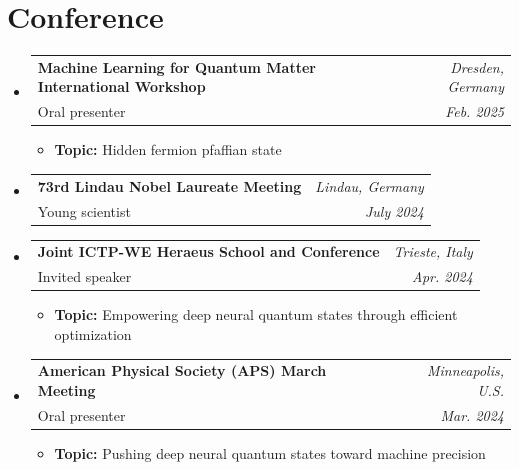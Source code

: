 \documentclass[a4paper,11pt]{article}
\makeatletter
\newcommand{\resumeItem}[1]{\item\small{#1 \vspace{-2pt}}}
\newcommand{\resumeSubheading}[4]{
  \vspace{-2pt}\item
    \begin{tabular*}{0.97\textwidth}[t]{l@{\extracolsep{\fill}}r}
      \textbf{#1} & \textit{\small #2} \\
      \small#3 & \textit{\small #4} \\
    \end{tabular*}\vspace{-7pt}
}
\newcommand{\resumeSubHeadingListStart}{\begin{itemize}[leftmargin=0.15in, label={}]}
\newcommand{\resumeSubHeadingListEnd}{\end{itemize}}
\newcommand{\resumeItemListStart}{\begin{itemize}}
\newcommand{\resumeItemListEnd}{\end{itemize}\vspace{-5pt}}
\makeatother
\begin{document}
\section{Conference}
  \resumeSubHeadingListStart
    \resumeSubheading
      {Machine Learning for Quantum Matter International Workshop}{Dresden, Germany}
      {Oral presenter}{Feb. 2025}
      \resumeItemListStart
        \resumeItem{\textbf{Topic:} Hidden fermion pfaffian state}
      \resumeItemListEnd
    \resumeSubheading
      {73rd Lindau Nobel Laureate Meeting}{Lindau, Germany}
      {Young scientist}{July 2024}
    \resumeSubheading
      {Joint ICTP-WE Heraeus School and Conference}{Trieste, Italy}
      {Invited speaker}{Apr. 2024}
      \resumeItemListStart
        \resumeItem{\textbf{Topic:} Empowering deep neural quantum states through efficient optimization}
      \resumeItemListEnd
    \resumeSubheading
      {American Physical Society (APS) March Meeting}{Minneapolis, U.S.}
      {Oral presenter}{Mar. 2024}
      \resumeItemListStart
        \resumeItem{\textbf{Topic:} Pushing deep neural quantum states toward machine precision}
      \resumeItemListEnd
  \resumeSubHeadingListEnd

\end{document}
